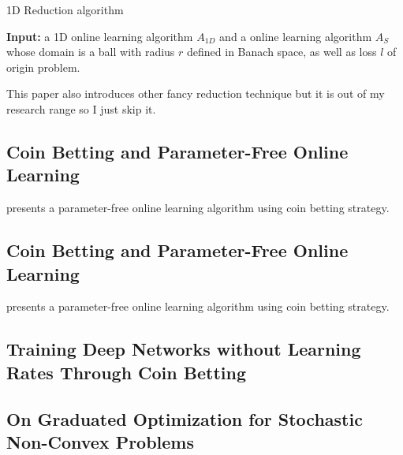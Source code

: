 \begin{algorithm}
\caption{1D Reduction algorithm}
\label{alg:1DReduction}
{\bfseries Input:} a 1D online learning algorithm $A_{1D}$ and a online learning algorithm $A_S$ whose domain is a ball with radius $r$ defined in Banach space, as well as loss $l$ of origin problem.
\begin{algorithmic}[1]
\EndFor
\end{algorithmic}
\end{algorithm}

This paper also introduces other fancy reduction technique but it is out of my research range so I just skip it.

\subsection{Coin Betting and Parameter-Free Online Learning}
\cite{Orabona2016} presents a parameter-free online learning algorithm using coin betting strategy. 

\subsection{Coin Betting and Parameter-Free Online Learning}
\cite{Orabona2016} presents a parameter-free online learning algorithm using coin betting strategy. 

\subsection{Training Deep Networks without Learning Rates Through Coin Betting}
\cite{Orabona2017}

\subsection{On Graduated Optimization for Stochastic Non-Convex Problems}
\cite{Hazan2015} 

